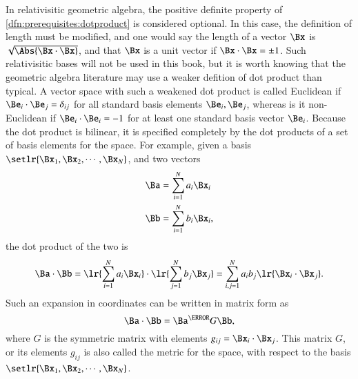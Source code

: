 

In relativisitic geometric algebra, the positive definite property of \cref{dfn:prerequisites:dotproduct} is considered optional.
In this case, the definition of length must be modified, and one would say the length of a vector \( \Bx \) is \( \sqrt{\Abs{\Bx \cdot \Bx}} \), and that \( \Bx \) is a unit vector if \( \Bx \cdot \Bx = \pm 1 \).
Such relativisitic bases will not be used in this book, but it is worth knowing that the geometric algebra literature may use a weaker defition of dot product than typical.
A vector space
with such a weakened dot product is called Euclidean if \( \Be_i \cdot \Be_j = \delta_{ij} \) for all standard basis elements \( \Be_i, \Be_j \), whereas is it non-Euclidean if \( \Be_i \cdot \Be_i = -1 \) for at least one standard basis vector \( \Be_i \).
Because the dot product is bilinear, it is
specified completely by the dot products of a set of basis elements for the space.
For example,
given a basis \( \setlr{ \Bx_1, \Bx_2, \cdots, \Bx_N} \), and two vectors
\begin{dmath}\label{eqn:prereq_standardbasis:240}
\begin{aligned}
   \Ba &= \sum_{i = 1}^N a_i \Bx_i \\
   \Bb &= \sum_{i = 1}^N b_i \Bx_i,
\end{aligned}
\end{dmath}
the dot product of the two is
\begin{dmath}\label{eqn:prereq_standardbasis:260}
\Ba \cdot \Bb
=
   \lr{ \sum_{i = 1}^N a_i \Bx_i } \cdot
   \lr{ \sum_{j = 1}^N b_j \Bx_j }
=
   \sum_{i,j = 1}^N a_i b_j \lr{ \Bx_i \cdot \Bx_j }.
\end{dmath}
Such an expansion in coordinates can be written in matrix form as
\begin{dmath}\label{eqn:prereq_standardbasis:280}
\Ba \cdot \Bb
=
\Ba^\T G \Bb,
\end{dmath}
where \( G \) is the symmetric matrix with elements \( g_{ij} = \Bx_i \cdot \Bx_j \).
This matrix \( G \), or its elements \( g_{ij} \) is also called the metric for the space, with respect to the basis \( \setlr{ \Bx_1, \Bx_2, \cdots, \Bx_N} \).

